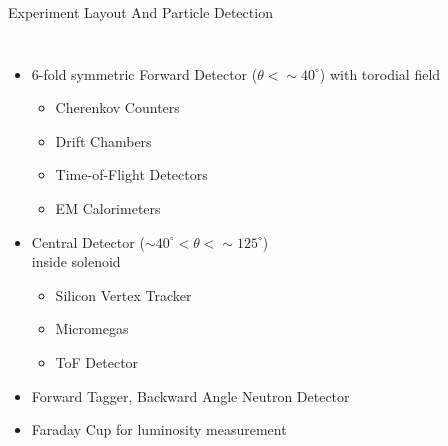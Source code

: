 \documentclass[aspectratio=169]{beamer}
\begin{document}
\begin{frame}{Experiment Layout And Particle Detection} \label{frame:datasets3}
\vspace{-0.5cm}
        \begin{columns}[t, onlytextwidth]
                \begin{itemize}
                    \setlength\itemsep{.35em}
                    \item 6-fold symmetric Forward Detector ($\theta < \sim 40 ^{\circ}$) with torodial field
                     \begin{itemize}
                    \setlength\itemsep{.25em}
                        \item Cherenkov Counters
                        \item Drift Chambers
                        \item Time-of-Flight Detectors
                        \item EM Calorimeters
                    \end{itemize}
                      \item Central Detector ($\sim40^{\circ} < \theta < \sim 125 ^{\circ}$) \\
                      inside solenoid
                     \begin{itemize}
                    \setlength\itemsep{.25em}
                        \item Silicon Vertex Tracker
                        \item Micromegas
                        \item ToF Detector

                    \end{itemize}
                    
                    \item Forward Tagger, Backward Angle Neutron Detector
                    \item Faraday Cup for luminosity measurement
                
            
                \end{itemize}
            
                \vspace{0.1cm}
                

\end{columns}
\end{frame}
\end{document}
